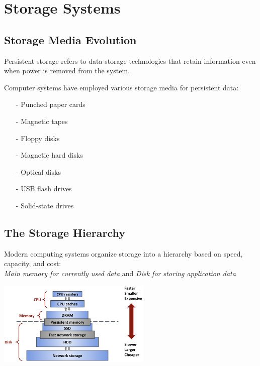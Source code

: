 \documentclass[../../compsys.tex]{subfiles}
\begin{document}
\section{Storage Systems}

\subsection{Storage Media Evolution}

\begin{definition}
Persistent storage refers to data storage technologies that retain information even when power is removed from the system.
\end{definition}
\vspace{5px}
Computer systems have employed various storage media for persistent data:\\[8px]
\begin{minipage}{0.45\textwidth}
\begin{itemize}
    \item[-] Punched paper cards
    \item[-] Magnetic tapes
    \item[-] Floppy disks
    \item[-] Magnetic hard disks
\end{itemize}
\end{minipage}
\hfill
\begin{minipage}{0.45\textwidth}
\begin{itemize}
    \item[-] Optical disks
    \item[-] USB flash drives
    \item[-] Solid-state drives
\end{itemize}
\end{minipage}

\subsection{The Storage Hierarchy}

Modern computing systems organize storage into a hierarchy based on speed, capacity, and cost: \\
\textit{Main memory for currently used data} and \textit{Disk for storing application data}
\begin{center}
    \includegraphics[width=0.55\textwidth]{chapters/L8/images/hierarchy.png}
\end{center}
\end{document}
